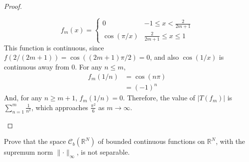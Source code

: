 \documentclass[12pt]{article}
\newcommand{\R}{\mathbb{R}}
\theoremstyle{definition}
\newenvironment{problem}[2][Problem]{\begin{trivlist}
\item[\hskip \labelsep {\bfseries #1}\hskip \labelsep {\bfseries #2.}]}{\end{trivlist}}
\begin{document}
\begin{proof}
\begin{enumerate}[label=(\roman*)]
        \[
        f_m(x) = \begin{cases}
        0 & -1 \leq x < \frac{2}{2m + 1}\\
        \cos(\pi/x) & \frac{2}{2m + 1} \leq x \leq 1
        \end{cases}
        \]
        This function is continuous, since $f(2/(2m+1)) = \cos((2m+1)\pi/2) = 0$, and also $\cos(1/x)$ is continuous away from $0$. For any $n \leq m$, 
        \begin{align*}
            f_m(1/n) &= \cos(n\pi)\\ &= (-1)^n
        \end{align*}
        And, for any $n \geq m+1$, $f_m(1/n) = 0$. Therefore, the value of $\lvert T(f_m) \rvert$ is $\sum_{n=1}^m \frac{1}{n^2}$, which approaches $\frac{\pi^2}{6}$ as $m \to \infty$.
    \end{enumerate}
\end{proof}
\begin{problem}{4}
Prove that the space $\mathcal{C}_b(\R^N)$ of bounded continuous functions on $\R^N$, with the supremum norm $\lVert \cdot \rVert_\infty$, is not separable.
\end{problem}
\end{document}
